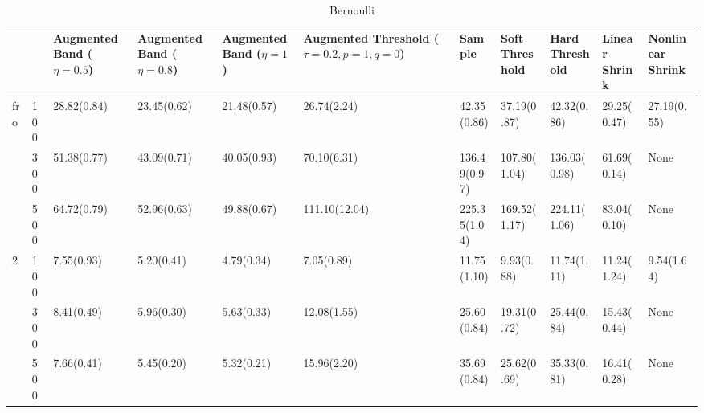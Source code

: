 \begin{table}[htbp]
\centering
\caption{Bernoulli}
\label{my label}
\begin{tabular}{ll|p{2cm}p{2cm}p{2cm}p{2cm}p{2cm}p{2cm}p{2cm}p{2cm}p{2cm}}
\toprule
  &     & Augmented Band ($\eta=0.5$) & Augmented Band ($\eta=0.8$) & Augmented Band ($\eta=1$) & Augmented Threshold ($\tau=0.2, p=1, q=0$) &        Sample & Soft Threshold & Hard Threshold & Linear Shrink & Nonlinear Shrink \\
\midrule
fro & 100 &                 28.82(0.84) &                 23.45(0.62) &               21.48(0.57) &                                26.74(2.24) &   42.35(0.86) &    37.19(0.87) &    42.32(0.86) &   29.25(0.47) &      27.19(0.55) \\
  & 300 &                 51.38(0.77) &                 43.09(0.71) &               40.05(0.93) &                                70.10(6.31) &  136.49(0.97) &   107.80(1.04) &   136.03(0.98) &   61.69(0.14) &             None \\
  & 500 &                 64.72(0.79) &                 52.96(0.63) &               49.88(0.67) &                              111.10(12.04) &  225.35(1.04) &   169.52(1.17) &   224.11(1.06) &   83.04(0.10) &             None \\
2 & 100 &                  7.55(0.93) &                  5.20(0.41) &                4.79(0.34) &                                 7.05(0.89) &   11.75(1.10) &     9.93(0.88) &    11.74(1.11) &   11.24(1.24) &       9.54(1.64) \\
  & 300 &                  8.41(0.49) &                  5.96(0.30) &                5.63(0.33) &                                12.08(1.55) &   25.60(0.84) &    19.31(0.72) &    25.44(0.84) &   15.43(0.44) &             None \\
  & 500 &                  7.66(0.41) &                  5.45(0.20) &                5.32(0.21) &                                15.96(2.20) &   35.69(0.84) &    25.62(0.69) &    35.33(0.81) &   16.41(0.28) &             None \\
\bottomrule
\end{tabular}
\end{table}

